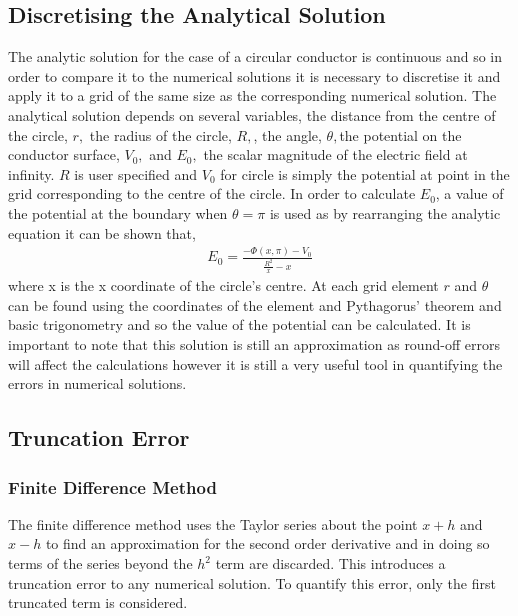 \documentclass[aps,twocolumn,pre,nofootinbib,10pt]{revtex4-1}
\begin{document}
\subsection{Discretising the Analytical Solution}

The analytic solution for the case of a circular conductor is continuous and so in order to compare it to the numerical solutions it is necessary to discretise it and apply it to a grid of the same size as the corresponding numerical solution. The analytical solution depends on several variables, the distance from the centre of the circle, \(r,\) the radius of the circle, \(R,\), the angle, \(\theta,\)the potential on the conductor surface, \(V_0,\) and \(E_0,\) the scalar magnitude of the electric field at infinity. \(R\) is user specified and \(V_0\) for circle is simply the potential at point in the grid corresponding to the centre of the circle. In order to calculate \(E_0\), a value of the potential at the boundary when \(\theta = \pi\) is used as by rearranging the analytic equation it can be shown that,
\begin{gather*}
E_0 = \frac{-\Phi(x,\pi)-V_0}{\frac{R^2}{x} - x}
\end{gather*}
where x is the x coordinate of the circle's centre.
At each grid element \(r\) and \(\theta\) can be found using the coordinates of the element and Pythagorus' theorem and basic trigonometry and so the value of the potential can be calculated. It is important to note that this solution is still an approximation as round-off errors will affect the calculations however it is still a very useful tool in quantifying the errors in numerical solutions.



\subsection{Truncation Error}

\subsubsection{Finite Difference Method}

The finite difference method uses the Taylor series about the point \(x+h\) and \(x-h\) to find an approximation for the second order derivative and in doing so terms of the series beyond the \(h^2\) term are discarded. This introduces a truncation error to any numerical solution. To quantify this error, only the first truncated term is considered. 
\end{document}
